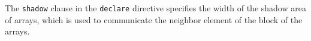 





The {\tt shadow} clause in the {\tt declare} directive specifies the
width of the shadow area of arrays, which is used to communicate the
neighbor element of the block of the arrays.
%
%

